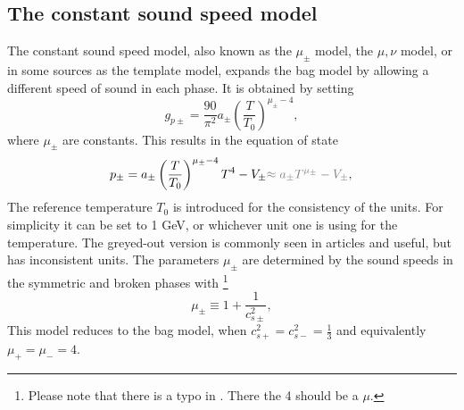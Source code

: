\subsection{The constant sound speed model}
\label{const_cs}
The constant sound speed model, also known as the $\mu_\pm$ model, the $\mu, \nu$ model,
or in some sources as the template model,
expands the bag model by allowing a different speed of sound in each phase.
It is obtained by setting
\begin{equation}
g_{p\pm} = \frac{90}{\pi^2} a_\pm \left( \frac{T}{T_0} \right)^{\mu_\pm - 4},
\end{equation}
where $\mu_\pm$ are constants.
This results in the equation of state
\cites[eq. 15]{giese_2021}[eq. 38]{giese_2020}
\begin{equation}
p_\pm = a_\pm \left( \frac{T}{T_0} \right)^{\mu_\pm - 4} T^4 - V_\pm {\color{gray} \approx a_\pm T^{\mu_\pm} - V_\pm }, \\
\end{equation}
The reference temperature $T_0$ is introduced for the consistency of the units.
For simplicity it can be set to 1 GeV, or whichever unit one is using for the temperature.
The greyed-out version is commonly seen in articles and useful, but has inconsistent units.
The parameters $\mu_\pm$ are determined by the sound speeds in the symmetric and broken phases with
\cites[eq. 16]{giese_2021}[eq. 39]{giese_2020}
\footnote{Please note that there is a typo in \cite[eq. 15]{giese_2021}. There the 4 should be a $\mu$.}
\begin{equation}
\mu_\pm \equiv 1 + \frac{1}{c_{s\pm}^2},
\end{equation}
This model reduces to the bag model,
when $c_{s+}^2 = c_{s-}^2 = \frac{1}{3}$
and equivalently
$\mu_+ = \mu_- = 4$.

